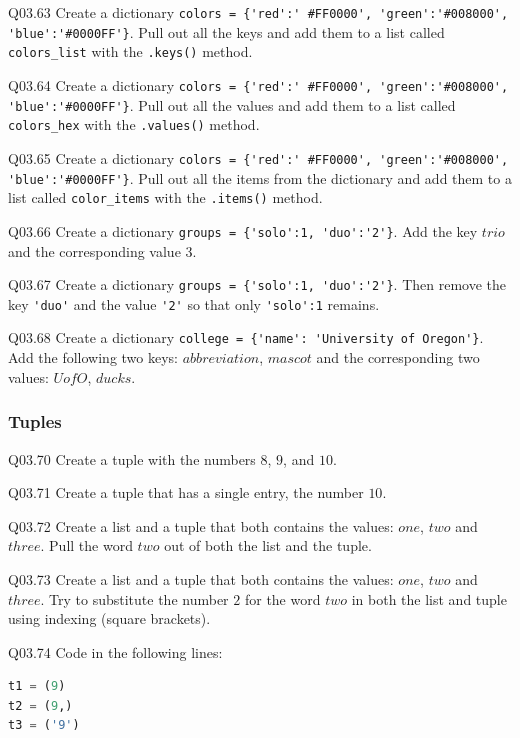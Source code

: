 \documentclass{book}
\begin{document}
Q03.63 Create a dictionary
\lstinline!colors = {'red':' #FF0000', 'green':'#008000', 'blue':'#0000FF'}!.
Pull out all the keys and add them to a list called
\lstinline!colors_list! with the \lstinline!.keys()! method.

Q03.64 Create a dictionary
\lstinline!colors = {'red':' #FF0000', 'green':'#008000', 'blue':'#0000FF'}!.
Pull out all the values and add them to a list called
\lstinline!colors_hex! with the \lstinline!.values()! method.

Q03.65 Create a dictionary
\lstinline!colors = {'red':' #FF0000', 'green':'#008000', 'blue':'#0000FF'}!.
Pull out all the items from the dictionary and add them to a list called
\lstinline!color_items! with the \lstinline!.items()! method.

Q03.66 Create a dictionary \lstinline!groups = {'solo':1, 'duo':'2'}!.
Add the key \(trio\) and the corresponding value \(3\).

Q03.67 Create a dictionary \lstinline!groups = {'solo':1, 'duo':'2'}!.
Then remove the key \lstinline!'duo'! and the value \lstinline!'2'! so
that only \lstinline!'solo':1! remains.

Q03.68 Create a dictionary
\lstinline!college = {'name': 'University of Oregon'}!. Add the
following two keys: \(abbreviation\), \(mascot\) and the corresponding
two values: \(UofO\), \(ducks\).
    




    
        \subsubsection{Tuples}\label{tuples}

Q03.70 Create a tuple with the numbers \(8\), \(9\), and \(10\).

Q03.71 Create a tuple that has a single entry, the number \(10\).

Q03.72 Create a list and a tuple that both contains the values: \(one\),
\(two\) and \(three\). Pull the word \(two\) out of both the list and
the tuple.

Q03.73 Create a list and a tuple that both contains the values: \(one\),
\(two\) and \(three\). Try to substitute the number \(2\) for the word
\(two\) in both the list and tuple using indexing (square brackets).

Q03.74 Code in the following lines:

\begin{lstlisting}[language=Python]
t1 = (9)
t2 = (9,)
t3 = ('9')
\end{lstlisting}
\end{document}
